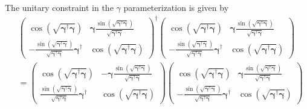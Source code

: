 \documentclass[aps, preprint]{revtex4}
\begin{document}
The unitary constraint in the $\gamma $ parameterization is given by
\begin{align} & \left (\begin{array}{cc}\cos  \left (\sqrt{\mathbf{\gamma }^{ \dag } \mathbf{\gamma }}\right ) & \mathbf{\gamma } \frac{\sin  \left (\sqrt{\mathbf{\gamma }^{ \dag } \mathbf{\gamma }}\right )}{\sqrt{\mathbf{\gamma }^{ \dag } \mathbf{\gamma }}} \\
 -\frac{\sin  \left (\sqrt{\mathbf{\gamma }^{ \dag } \mathbf{\gamma }}\right )}{\sqrt{\mathbf{\gamma }^{ \dag } \mathbf{\gamma }}} \mathbf{\gamma }^{ \dag } & \cos  \left (\sqrt{\mathbf{\gamma }^{ \dag } \mathbf{\gamma }}\right )\end{array}\right )^{ \dag } \left (\begin{array}{cc}\cos  \left (\sqrt{\mathbf{\gamma }^{ \dag } \mathbf{\gamma }}\right ) & \mathbf{\gamma } \frac{\sin  \left (\sqrt{\mathbf{\gamma }^{ \dag } \mathbf{\gamma }}\right )}{\sqrt{\mathbf{\gamma }^{ \dag } \mathbf{\gamma }}} \\
 -\frac{\sin  \left (\sqrt{\mathbf{\gamma }^{ \dag } \mathbf{\gamma }}\right )}{\sqrt{\mathbf{\gamma }^{ \dag } \mathbf{\gamma }}} \mathbf{\gamma }^{ \dag } & \cos  \left (\sqrt{\mathbf{\gamma }^{ \dag } \mathbf{\gamma }}\right )\end{array}\right ) \\
 &  =\left (\begin{array}{cc}\cos  \left (\sqrt{\mathbf{\gamma }^{ \dag } \mathbf{\gamma }}\right ) &  -\mathbf{\gamma } \frac{\sin  \left (\sqrt{\mathbf{\gamma }^{ \dag } \mathbf{\gamma }}\right )}{\sqrt{\mathbf{\gamma }^{ \dag } \mathbf{\gamma }}} \\
\frac{\sin  \left (\sqrt{\mathbf{\gamma }^{ \dag } \mathbf{\gamma }}\right )}{\sqrt{\mathbf{\gamma }^{ \dag } \mathbf{\gamma }}} \mathbf{\gamma }^{ \dag } & \cos  \left (\sqrt{\mathbf{\gamma }^{ \dag } \mathbf{\gamma }}\right )\end{array}\right ) \left (\begin{array}{cc}\cos  \left (\sqrt{\mathbf{\gamma }^{ \dag } \mathbf{\gamma }}\right ) & \mathbf{\gamma } \frac{\sin  \left (\sqrt{\mathbf{\gamma }^{ \dag } \mathbf{\gamma }}\right )}{\sqrt{\mathbf{\gamma }^{ \dag } \mathbf{\gamma }}} \\
 -\frac{\sin  \left (\sqrt{\mathbf{\gamma }^{ \dag } \mathbf{\gamma }}\right )}{\sqrt{\mathbf{\gamma }^{ \dag } \mathbf{\gamma }}} \mathbf{\gamma }^{ \dag } & \cos  \left (\sqrt{\mathbf{\gamma }^{ \dag } \mathbf{\gamma }}\right )\end{array}\right ) \\

\end{align}
\end{document}
